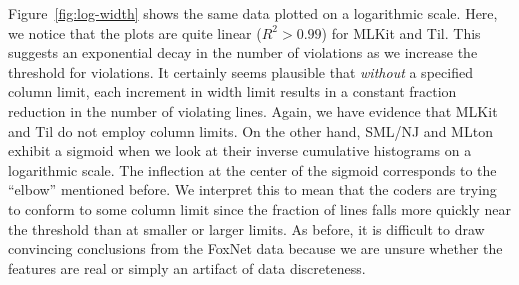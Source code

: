 \documentclass[12pt,abstracton]{scrartcl}
\begin{document}
Figure~\ref{fig:log-width} shows the same data plotted on a logarithmic scale.
Here, we notice that the plots are quite linear ($R^{2} > 0.99$) for MLKit and Til.
This suggests an exponential decay in the number of violations as we increase the
threshold for violations. It certainly seems plausible that \emph{without} a
specified column limit, each increment in width limit results in a constant
fraction reduction in the number of violating lines.
Again, we have evidence that MLKit and Til do not employ column limits.
On the other hand, SML/NJ
and MLton exhibit a sigmoid when we look at their inverse cumulative histograms
on a logarithmic scale. The inflection at the center of the sigmoid corresponds to
the ``elbow'' mentioned before. We interpret this to mean that the coders are trying
to conform to some column limit since the fraction of lines falls more quickly near
the threshold than at smaller or larger limits. As before, it is difficult to
draw convincing conclusions from the FoxNet data because we are unsure
whether the features are real or simply an artifact of data discreteness.
\end{document}
